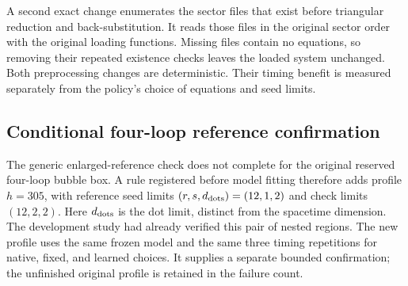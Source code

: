A second exact change enumerates the sector files that exist before triangular reduction and back-substitution. It reads those files in the original sector order with the original loading functions. Missing files contain no equations, so removing their repeated existence checks leaves the loaded system unchanged. Both preprocessing changes are deterministic. Their timing benefit is measured separately from the policy's choice of equations and seed limits.

\subsection{Conditional four-loop reference confirmation}
The generic enlarged-reference check does not complete for the original reserved four-loop bubble box. A rule registered before model fitting therefore adds profile $h=305$, with reference seed limits $(r,s,d_{\rm dots})=(12,1,2)$ and check limits $(12,2,2)$. Here $d_{\rm dots}$ is the dot limit, distinct from the spacetime dimension. The development study had already verified this pair of nested regions. The new profile uses the same frozen model and the same three timing repetitions for native, fixed, and learned choices. It supplies a separate bounded confirmation; the unfinished original profile is retained in the failure count.
